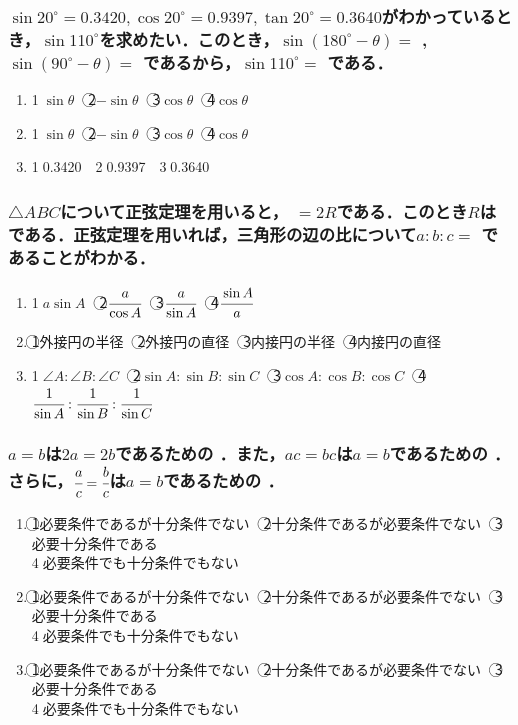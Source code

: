 \documentclass[onecolumn,10pt]{jarticle}
\newcommand{\ctext}[1]{\textcircled{\scriptsize #1}}
\begin{document}
\subsubsection{$\sin20^\circ=0.3420, \cos20^\circ=0.9397, \tan20^\circ=0.3640$がわかっているとき，$\sin110^\circ$を求めたい．このとき，$\sin(180^\circ-\theta)=$  , $\sin(90^\circ-\theta)=$  であるから，$\sin110^\circ=$  である．}
\begin{enumerate}[(1)]
    \item \ctext{1}$\sin\theta$　\ctext{2}$-\sin\theta$　\ctext{3}$\cos\theta$　\ctext{4}$\cos\theta$
    \item \ctext{1}$\sin\theta$　\ctext{2}$-\sin\theta$　\ctext{3}$\cos\theta$　\ctext{4}$\cos\theta$
    \item \ctext{1}0.3420　\ctext{2}0.9397　\ctext{3}0.3640
\end{enumerate}

\subsubsection{$\triangle{ABC}$について正弦定理を用いると，  $=2R$である．このとき$R$は  である．正弦定理を用いれば，三角形の辺の比について$a:b:c=$  であることがわかる．}
\begin{enumerate}[(1)]
    \item \ctext{1}$a\sin A$　\ctext{2}$\cfrac{a}{\cos A}$　\ctext{3}$\cfrac{a}{\sin A}$　\ctext{4}$\cfrac{\sin A}{a}$
    \item \ctext{1}外接円の半径　\ctext{2}外接円の直径　\ctext{3}内接円の半径　\ctext{4}内接円の直径
    \item \ctext{1}$\angle A:\angle B:\angle C$　\ctext{2}$\sin A:\sin B:\sin C$　\ctext{3}$\cos A:\cos B: \cos C$　\ctext{4}$\cfrac{1}{\sin A}:\cfrac{1}{\sin B}:\cfrac{1}{\sin C}$
\end{enumerate}

\newpage

\subsubsection{$a=b$は$2a=2b$であるための  ．また，$ac=bc$は$a=b$であるための  ．さらに，$\cfrac{a}{c}=\cfrac{b}{c}$は$a=b$であるための  ．}
\begin{enumerate}[(1)]
    \item \ctext{1}必要条件であるが十分条件でない　\ctext{2}十分条件であるが必要条件でない　\ctext{3}必要十分条件である\\\ctext{4}必要条件でも十分条件でもない
    \item \ctext{1}必要条件であるが十分条件でない　\ctext{2}十分条件であるが必要条件でない　\ctext{3}必要十分条件である\\\ctext{4}必要条件でも十分条件でもない
    \item \ctext{1}必要条件であるが十分条件でない　\ctext{2}十分条件であるが必要条件でない　\ctext{3}必要十分条件である\\\ctext{4}必要条件でも十分条件でもない
\end{enumerate}
\end{document}
